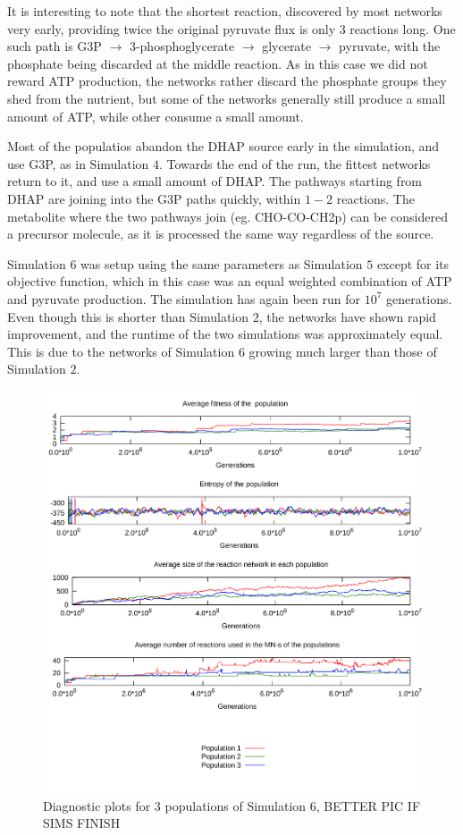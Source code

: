\documentclass[a4paper,12pt]{article}
\begin{document}
It is interesting to note that the shortest reaction, discovered by most networks very early, providing twice the original pyruvate flux is only $3$ reactions long. One such  path is G3P $\rightarrow$ 3-phosphoglycerate $\rightarrow$ glycerate $\rightarrow$ pyruvate, with the phosphate being discarded at the middle reaction. 
As in this case we did not reward ATP production, the networks rather discard the phosphate groups they shed from the nutrient, but some of the networks generally still produce a small amount of ATP, while other consume a small amount. 

Most of the populatios abandon the DHAP source early in the simulation, and use G3P, as in Simulation $4$. Towards the end of the run, the fittest networks return to it, and use a small amount of DHAP. The pathways starting from DHAP are joining into the G3P paths quickly, within $1-2$ reactions. The metabolite where the two pathways join (eg. CHO-CO-CH2p) can be considered a precursor molecule, as it is processed the same way regardless of the source. 




Simulation $6$ was setup using the same parameters as Simulation $5$ except for its objective function, which in this case was an equal weighted combination of ATP and pyruvate production. The simulation has again been run for $10^7$ generations. Even though this is shorter than Simulation $2$, the networks have shown rapid  improvement, and the runtime of the two simulations was approximately equal. This is due to the networks of Simulation $6$ growing much larger than those of Simulation $2$. 

\begin{figure}[htpb]
	\centering
	\includegraphics[width=0.8\linewidth]{simulationequalatppyruvate.pdf}
	\caption{Diagnostic plots for 3 populations of Simulation 6, BETTER PIC IF SIMS FINISH}
	\label{fig:simulationequalatppyruvate}
\end{figure}
\end{document}
